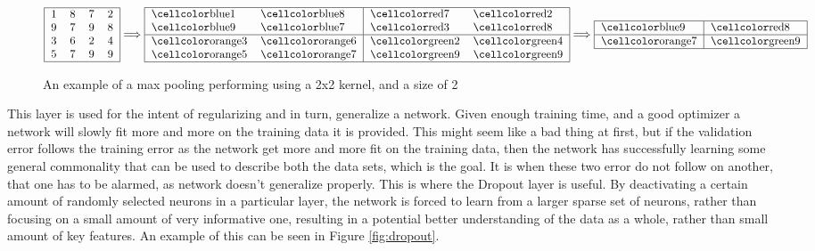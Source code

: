 \begin{description}
    \begin{figure}
    \centering
    \begin{equation}
        \begin{tabular}{|llll|}
        \hline
        1 & 8 & 7 & 2 \\
        9 & 7 & 9 & 8 \\
        3 & 6 & 2 & 4 \\
        5 & 7 & 9 & 9 \\\hline
        \end{tabular}
            \Longrightarrow
        \begin{tabular}{|ll|ll|}
        \hline
        \cc{blue}1 & \cc{blue}8 & \cc{red}7 & \cc{red}2 \\
        \cc{blue}9 & \cc{blue}7 & \cc{red}3 & \cc{red}8 \\ \hline
        \cc{orange}3 & \cc{orange}6 & \cc{green}2 & \cc{green}4 \\
        \cc{orange}5 & \cc{orange}7 & \cc{green}9 & \cc{green}9\\
        \hline
        \end{tabular}
            \Longrightarrow
        \begin{tabular}{|l|l|}
        \hline
        \cc{blue}9 & \cc{red}8\\\hline
        \cc{orange}7 & \cc{green}9\\
        \hline
        \end{tabular}
    \end{equation}
    \caption{An example of a max pooling performing using a 2x2 kernel, and a
    size of 2}
    \label{fig:max_pool}
    \end{figure}


    \item[Dropout Layer:]

        This layer is used for the intent of regularizing and in turn,
        generalize a network. Given enough training time, and a good optimizer
        a network will slowly fit more and more on the training data it is
        provided. This might seem like a bad thing at first, but if the
        validation error follows the training error as the network get more
        and more fit on the training data, then the network has successfully
        learning some general commonality that can be used to describe both the
        data sets, which is the goal. It is when these two error do not follow
        on another, that one has to be alarmed, as network doesn't generalize
        properly. This is where the Dropout layer is useful. By deactivating a
        certain amount of randomly selected neurons in a particular layer, the
        network is forced to learn from a larger sparse set of neurons, rather
        than focusing on a small amount of very informative one, resulting in
        a potential better understanding of the data as a whole, rather than
        small amount of key features. An example of this can be seen in Figure
        \ref{fig:dropout}.


\end{description}
